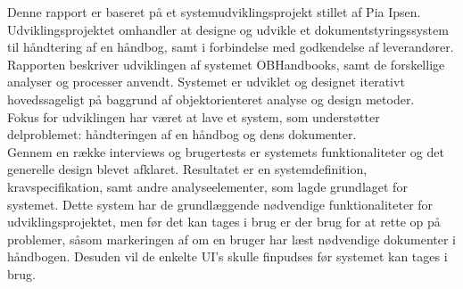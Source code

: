 Denne rapport er baseret på et systemudviklingsprojekt stillet af Pia Ipsen.
Udviklingsprojektet omhandler at designe og udvikle et dokumentstyringssystem til håndtering af en håndbog, samt i forbindelse med godkendelse af leverandører.\\

Rapporten beskriver udviklingen af systemet OBHandbooks, samt de forskellige analyser og processer anvendt.
Systemet er udviklet og designet iterativt hovedssageligt på baggrund af objektorienteret analyse og design metoder.\\

Fokus for udviklingen har været at lave et system, som understøtter delproblemet: håndteringen af en håndbog og dens dokumenter.
\\
Gennem en række interviews og brugertests er systemets funktionaliteter og det generelle design blevet afklaret.
Resultatet er en systemdefinition, kravspecifikation, samt andre analyseelementer, som lagde grundlaget for systemet.
Dette system har de grundlæggende nødvendige funktionaliteter for udviklingsprojektet, men før det kan tages i brug er der brug for at rette op på problemer, såsom markeringen af om en bruger har læst nødvendige dokumenter i håndbogen.
Desuden vil de enkelte UI's skulle finpudses før systemet kan tages i brug.

